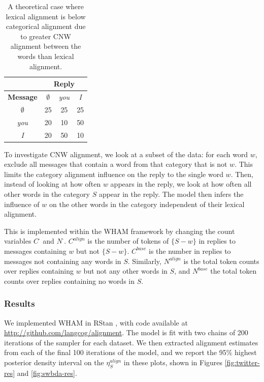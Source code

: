 \documentclass[11pt]{article}
\begin{document}


\begin{table}[t]
\begin{center}
\begin{tabular}{|c||c|c|c|}
\hline
& \multicolumn{3}{|c|}{\bf Reply} \\
\hline
\bf Message & $\emptyset$ & \textit{you} & \textit{I} \\ \hline
$\emptyset$ & 25 & 25 & 25\\
\textit{you} & 20 & 10 & 50 \\
\textit{I} & 20 & 50 & 10 \\
\hline
\end{tabular}
\end{center}
\caption{A theoretical case where lexical alignment is below categorical alignment due to greater CNW alignment between the words than lexical alignment.}
\end{table}


To investigate CNW alignment, we look at a subset of the data: for each word $w$, exclude all messages that contain a word from that category that is not $w$. This limits the category alignment influence on the reply to the single word $w$. Then, instead of looking at how often $w$ appears in the reply, we look at how often all other words in the category $S$ appear in the reply.  The model then infers the influence of $w$ on the other words in the category independent of their lexical alignment.

This is implemented within the WHAM framework by changing the count variables $C^\cdot$ and $N^\cdot$. $C^{align}$ is the number of tokens of $\{S-w\}$ in replies to messages containing $w$ but not $\{S - w\}$. $C^{base}$ is the number in replies to messages not containing any words in $S$.  Similarly, $N^{align}$ is the total token counts over replies containing $w$ but not any other words in $S$, and $N^{base}$ the total token counts over replies containing no words in $S$.

\subsubsection{Results}
We implemented WHAM in RStan \cite{Stan}, with code available at \url{http://github.com/langcog/alignment}. The model is fit with two chains of 200 iterations of the sampler for each dataset.  We then extracted alignment estimates from each of the final 100 iterations of the model, and we report the 95\% highest posterior density interval on the $\eta^{align}_S$ in these plots, shown in Figures \ref{fig:twitter-res} and \ref{fig:swbda-res}.
\end{document}
